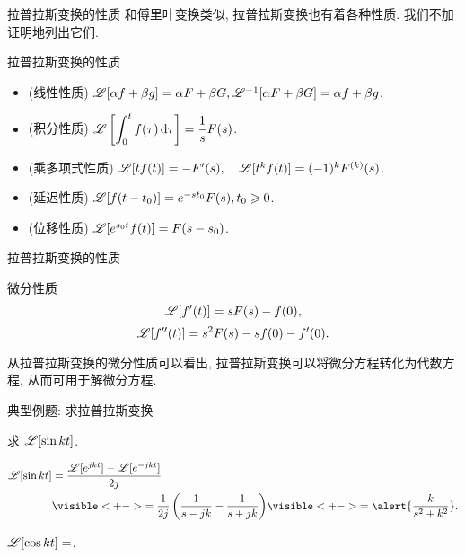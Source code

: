 \begin{frame}{拉普拉斯变换的性质}
	\onslide<+->
	和傅里叶变换类似, 拉普拉斯变换也有着各种性质. 我们不加证明地列出它们.

	\onslide<+->
	\begin{block}{拉普拉斯变换的性质}
		\begin{itemize}
			\item (线性性质) $\mathscr{L}[\alpha f+\beta g]=\alpha F+\beta G, \mathscr{L}^{-1}[\alpha F+\beta G]=\alpha f+\beta g$.
			\item (积分性质) $\displaystyle\mathscr{L}\left[\int_0^t f(\tau)\,\mathrm{d}\tau\right]=\frac 1s F(s)$.
			\item (乘多项式性质) $\mathscr{L}[tf(t)]=-F'(s),\quad\mathscr{L}[t^kf(t)]=(-1)^kF^{(k)}(s)$.
			\item (延迟性质) $\mathscr{L}[f(t-t_0)]=e^{-st_0}F(s), t_0\geqslant 0$.
			\item (位移性质) $\mathscr{L}[e^{s_0t}f(t)]=F(s-s_0)$.
		\end{itemize}
	\end{block}
\end{frame}


\begin{frame}{拉普拉斯变换的性质}	
	\onslide<+->
	\begin{alertblock}{微分性质}
		\[\mathscr{L}[f'(t)]=sF(s)-f(0),\]
		\[\mathscr{L}[f''(t)]=s^2F(s)-sf(0)-f'(0).\]
	\end{alertblock}

	\onslide<+->
	从拉普拉斯变换的微分性质可以看出, 拉普拉斯变换可以将微分方程转化为代数方程, 从而可用于解微分方程.
\end{frame}


\begin{frame}{典型例题: 求拉普拉斯变换}
	\onslide<+->
	\begin{example}
		求 $\mathscr{L}[\sin{kt}]$.
	\end{example}
	
	\onslide<+->
	\begin{solution}
		\begin{align*}
			\msl[\sin{kt}]&=\frac{\msl[e^{jkt}]-\msl[e^{-jkt}]}{2j}\\
			&\visible<+->{=\frac1{2j}\left(\frac1{s-jk}-\frac1{s+jk}\right)}
			\visible<+->{=\alert{\frac k{s^2+k^2}}.}
		\end{align*}
	\end{solution}
	
	\onslide<+->
	\begin{exercise}
		$\mathscr{L}[\cos{kt}]=$.
	\end{exercise}
\end{frame}


